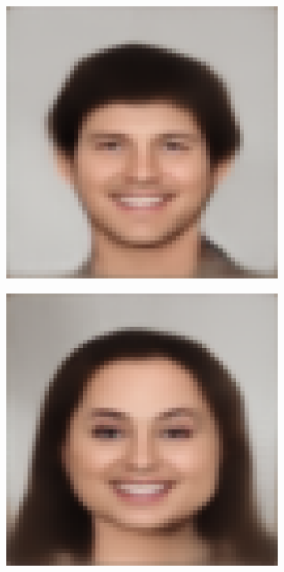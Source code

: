 \documentclass{IEEEcsmag}
\begin{document}
\begin{figure}[ht]
\begin{subfigure}{0.12\textwidth}
    \end{subfigure}
    \begin{subfigure}{0.12\textwidth}
        \includegraphics[width=\linewidth]{images/CelebA/1/simple_ae_5.png}
    \end{subfigure}
    \begin{subfigure}{0.12\textwidth}
        \includegraphics[width=\linewidth]{CUHK_Student/generated_images/f1-001-01-sz1.jpg_AE.png}

\end{subfigure}
\end{figure}
\end{document}
